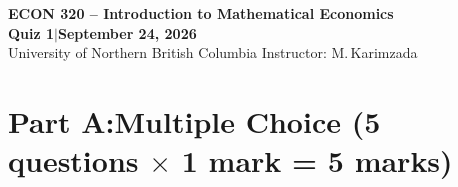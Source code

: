 \documentclass[11pt]{article}
\begin{document}

\begin{center}
{\Large\bfseries ECON 320 \;--\; Introduction to Mathematical Economics}\\[0.5em]
{\large\bfseries Quiz 1\quad$|$\quad September 24, 2026}\\[0.2em]
{\small University of Northern British Columbia\quad
 Instructor: M.\,Karimzada}
\end{center}

\vspace{0.5em}



\section{Part A:\enspace Multiple Choice\quad\normalfont\small
         (5 questions $\times$ 1 mark = 5 marks)}

\medskip
\end{document}
